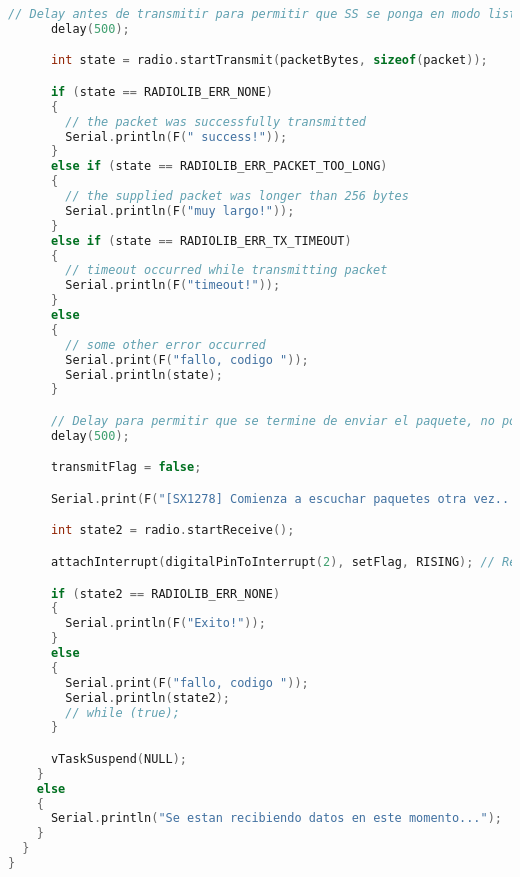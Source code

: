 \begin{lstlisting}[language=C++, caption=Creación de tareas en FreeRTOS]
      // Delay antes de transmitir para permitir que SS se ponga en modo listening
      delay(500);

      int state = radio.startTransmit(packetBytes, sizeof(packet));

      if (state == RADIOLIB_ERR_NONE)
      {
        // the packet was successfully transmitted
        Serial.println(F(" success!"));
      }
      else if (state == RADIOLIB_ERR_PACKET_TOO_LONG)
      {
        // the supplied packet was longer than 256 bytes
        Serial.println(F("muy largo!"));
      }
      else if (state == RADIOLIB_ERR_TX_TIMEOUT)
      {
        // timeout occurred while transmitting packet
        Serial.println(F("timeout!"));
      }
      else
      {
        // some other error occurred
        Serial.print(F("fallo, codigo "));
        Serial.println(state);
      }

      // Delay para permitir que se termine de enviar el paquete, no poner en modo receptor de inmediato
      delay(500);

      transmitFlag = false;

      Serial.print(F("[SX1278] Comienza a escuchar paquetes otra vez... \n"));

      int state2 = radio.startReceive();

      attachInterrupt(digitalPinToInterrupt(2), setFlag, RISING); // Reinicia ISR

      if (state2 == RADIOLIB_ERR_NONE)
      {
        Serial.println(F("Exito!"));
      }
      else
      {
        Serial.print(F("fallo, codigo "));
        Serial.println(state2);
        // while (true);
      }

      vTaskSuspend(NULL);
    }
    else
    {
      Serial.println("Se estan recibiendo datos en este momento...");
    }
  }
}

\end{lstlisting}


